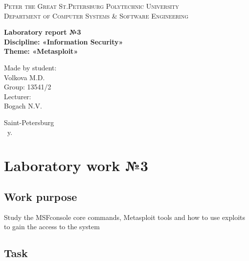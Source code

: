 \documentclass[14pt,a4paper,report]{report}
\begin{document}
\def\contentsname{Contents}

\begin{titlepage}
	\begin{center}
		\textsc{Peter the Great St.Petersburg Polytechnic University\\[5mm]
			Department of Computer Systems \& Software Engineering}
		
		\vfill
		
		\textbf{Laboratory report №3\\[3mm]
			Discipline: «Information Security»\\[3mm]
			Theme: «Metasploit»\\[41mm]
		}
	\end{center}
	
	\hfill
	\begin{minipage}{.4\textwidth}
		Made by student:\\[2mm] 
		Volkova M.D.\\
		Group: 13541/2\\[5mm]
		
		Lecturer:\\[2mm] 
		Bogach N.V.
	\end{minipage}
	\vfill
	\begin{center}
		Saint-Petersburg\\ \the\year\ y.
	\end{center}
\end{titlepage}

\tableofcontents
\clearpage

\chapter{Laboratory work №3}

\section{Work purpose}

Study the MSFconsole core commands, Metasploit tools and how to use exploits to gain the access to the system

\section{Task}
\end{document}

